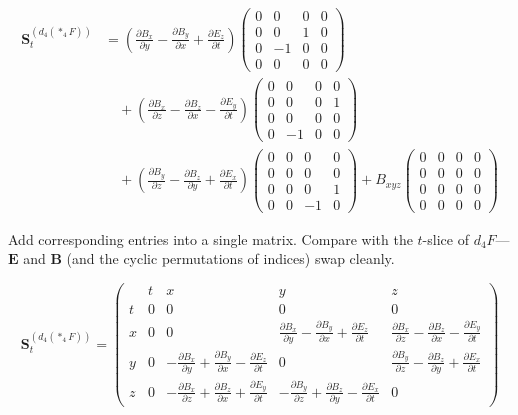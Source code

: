 \documentclass[a4paper,12pt,openany]{book}
\begin{document}
\[
\begin{aligned}
\mathbf{S}_{t}^{(d_4(\ast_4F))}
&= \left(\frac{\partial B_x}{\partial y} - \frac{\partial B_y}{\partial x} + \frac{\partial E_z}{\partial t}\right)
\begin{pmatrix}0&0&0&0\\[2pt]0&0&1&0\\[2pt]0&-1&0&0\\[2pt]0&0&0&0\end{pmatrix} \\[10pt]
&\quad+ \left(\frac{\partial B_x}{\partial z} - \frac{\partial B_z}{\partial x} - \frac{\partial E_y}{\partial t}\right)
\begin{pmatrix}0&0&0&0\\[2pt]0&0&0&1\\[2pt]0&0&0&0\\[2pt]0&-1&0&0\end{pmatrix} \\[10pt]
&\quad+ \left(\frac{\partial B_y}{\partial z} - \frac{\partial B_z}{\partial y} + \frac{\partial E_x}{\partial t}\right)
\begin{pmatrix}0&0&0&0\\[2pt]0&0&0&0\\[2pt]0&0&0&1\\[2pt]0&0&-1&0\end{pmatrix}
{+} B_{xyz}
\begin{pmatrix}0&0&0&0\\[2pt]0&0&0&0\\[2pt]0&0&0&0\\[2pt]0&0&0&0\end{pmatrix}
\end{aligned}
\]

Add corresponding entries into a single matrix. Compare with the
\(t\)-slice of \(d_4F\)—\(\mathbf{E}\) and \(\mathbf{B}\) (and the
cyclic permutations of indices) swap cleanly.

\[
\mathbf{S}_{t}^{(d_4(\ast_4F))}
{=}
\left(\begin{array}{c|cccc}
 & t & x & y & z \\\hline
t & 0 & 0 & 0 & 0 \\[6pt]
x & 0 & 0 &
\displaystyle\frac{\partial B_x}{\partial y} {-} \frac{\partial B_y}{\partial x} {+} \frac{\partial E_z}{\partial t} &
\displaystyle\frac{\partial B_x}{\partial z} {-} \frac{\partial B_z}{\partial x} {-} \frac{\partial E_y}{\partial t} \\[14pt]
y & 0 &
\displaystyle{-}\frac{\partial B_x}{\partial y} {+} \frac{\partial B_y}{\partial x} {-} \frac{\partial E_z}{\partial t} &
0 &
\displaystyle\frac{\partial B_y}{\partial z} {-} \frac{\partial B_z}{\partial y} {+} \frac{\partial E_x}{\partial t} \\[14pt]
z & 0 &
\displaystyle{-}\frac{\partial B_x}{\partial z} {+} \frac{\partial B_z}{\partial x} {+} \frac{\partial E_y}{\partial t} &
\displaystyle{-}\frac{\partial B_y}{\partial z} {+} \frac{\partial B_z}{\partial y} {-} \frac{\partial E_x}{\partial t} &
0
\end{array}\right)
\]
\end{document}
